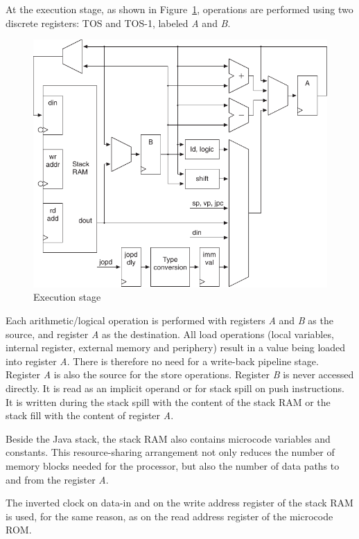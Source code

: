 At the execution stage, as shown in Figure~\ref{fig_arch_exe},
operations are performed using two discrete registers: TOS and
TOS-1, labeled \emph{A} and \emph{B}.

\begin{figure}
    \centering
    \includegraphics[scale=\picscale]{arch/arch_execute}
    \caption{Execution stage}
    \label{fig_arch_exe}
\end{figure}

Each arithmetic/logical operation is performed with registers
\emph{A} and \emph{B} as the source, and register \emph{A} as the
destination. All load operations (local variables, internal
register, external memory and periphery) result in a value being
loaded into register \emph{A}. There is therefore no need for a
write-back pipeline stage. Register \emph{A} is also the source for
the store operations. Register \emph{B} is never accessed directly.
It is read as an implicit operand or for stack spill on push
instructions. It is written during the stack spill with the content
of the stack RAM or the stack fill with the content of register
\emph{A}.

Beside the Java stack, the stack RAM also contains microcode
variables and constants. This resource-sharing arrangement not only
reduces the number of memory blocks needed for the processor, but
also the number of data paths to and from the register \nolinebreak
\emph{A}.

The inverted clock on data-in and on the write address register of
the stack RAM is used, for the same reason, as on the read address
register of the microcode ROM.

